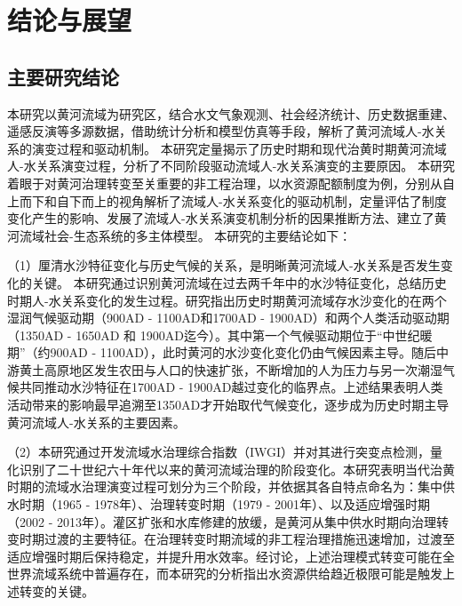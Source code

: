 \chapter{结论与展望}

\section{主要研究结论}

本研究以黄河流域为研究区，结合水文气象观测、社会经济统计、历史数据重建、遥感反演等多源数据，借助统计分析和模型仿真等手段，解析了黄河流域人-水关系的演变过程和驱动机制。
本研究定量揭示了历史时期和现代治黄时期黄河流域人-水关系演变过程，分析了不同阶段驱动流域人-水关系演变的主要原因。
本研究着眼于对黄河治理转变至关重要的非工程治理，以水资源配额制度为例，分别从自上而下和自下而上的视角解析了流域人-水关系变化的驱动机制，定量评估了制度变化产生的影响、发展了流域人-水关系演变机制分析的因果推断方法、建立了黄河流域社会-生态系统的多主体模型。
本研究的主要结论如下：

（1）厘清水沙特征变化与历史气候的关系，是明晰黄河流域人-水关系是否发生变化的关键。
本研究通过识别黄河流域在过去两千年中的水沙特征变化，总结历史时期人-水关系变化的发生过程。研究指出历史时期黄河流域存水沙变化的在两个湿润气候驱动期（900AD - 1100AD和1700AD - 1900AD）和两个人类活动驱动期（1350AD - 1650AD 和 1900AD迄今）。其中第一个气候驱动期位于“中世纪暖期”（约900AD - 1100AD），此时黄河的水沙变化变化仍由气候因素主导。随后中游黄土高原地区发生农田与人口的快速扩张，不断增加的人为压力与另一次潮湿气候共同推动水沙特征在1700AD - 1900AD越过变化的临界点。上述结果表明人类活动带来的影响最早追溯至1350AD才开始取代气候变化，逐步成为历史时期主导黄河流域人-水关系的主要因素。

（2）本研究通过开发流域水治理综合指数（IWGI）并对其进行突变点检测，量化识别了二十世纪六十年代以来的黄河流域治理的阶段变化。本研究表明当代治黄时期的流域水治理演变过程可划分为三个阶段，并依据其各自特点命名为：集中供水时期（1965 - 1978年）、治理转变时期（1979 - 2001年）、以及适应增强时期（2002 - 2013年）。灌区扩张和水库修建的放缓，是黄河从集中供水时期向治理转变时期过渡的主要特征。在治理转变时期流域的非工程治理措施迅速增加，过渡至适应增强时期后保持稳定，并提升用水效率。经讨论，上述治理模式转变可能在全世界流域系统中普遍存在，而本研究的分析指出水资源供给趋近极限可能是触发上述转变的关键。

